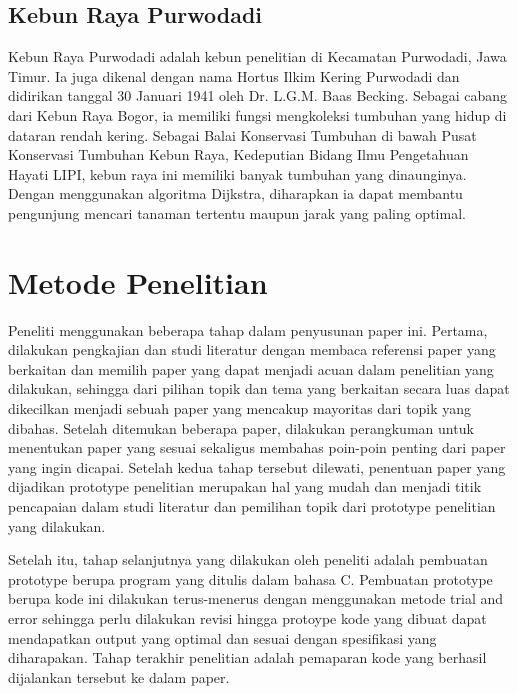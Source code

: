 \documentclass[conference]{IEEEtran}
\begin{document}
\subsection{Kebun Raya Purwodadi}

    Kebun Raya Purwodadi adalah kebun penelitian di Kecamatan Purwodadi, Jawa Timur. Ia juga dikenal dengan nama
    Hortus Ilkim Kering Purwodadi dan didirikan tanggal 30 Januari 1941 oleh Dr. L.G.M. Baas Becking. Sebagai cabang dari
    Kebun Raya Bogor, ia memiliki fungsi mengkoleksi tumbuhan
    yang hidup di dataran rendah kering. Sebagai Balai Konservasi
    Tumbuhan di bawah Pusat Konservasi Tumbuhan Kebun Raya,
    Kedeputian Bidang Ilmu Pengetahuan Hayati LIPI, kebun raya
    ini memiliki banyak tumbuhan yang dinaunginya. Dengan
    menggunakan algoritma Dijkstra, diharapkan ia dapat membantu pengunjung mencari tanaman tertentu maupun jarak
    yang paling optimal.

\section{Metode Penelitian}
    Peneliti menggunakan beberapa tahap dalam penyusunan
    paper ini. Pertama, dilakukan pengkajian dan studi literatur
    dengan membaca referensi paper yang berkaitan dan memilih
    paper yang dapat menjadi acuan dalam penelitian yang dilakukan, sehingga dari pilihan topik dan tema yang berkaitan
    secara luas dapat dikecilkan menjadi sebuah paper yang mencakup mayoritas dari topik yang dibahas. Setelah ditemukan
    beberapa paper, dilakukan perangkuman untuk menentukan
    paper yang sesuai sekaligus membahas poin-poin penting
    dari paper yang ingin dicapai. Setelah kedua tahap tersebut
    dilewati, penentuan paper yang dijadikan prototype penelitian
    merupakan hal yang mudah dan menjadi titik pencapaian
    dalam studi literatur dan pemilihan topik dari prototype penelitian yang dilakukan.

    Setelah itu, tahap selanjutnya yang dilakukan oleh peneliti
    adalah pembuatan prototype berupa program yang ditulis
    dalam bahasa C. Pembuatan prototype berupa kode ini dilakukan terus-menerus dengan menggunakan metode trial and
    error sehingga perlu dilakukan revisi hingga protoype kode
    yang dibuat dapat mendapatkan output yang optimal dan
    sesuai dengan spesifikasi yang diharapakan. Tahap terakhir
    penelitian adalah pemaparan kode yang berhasil dijalankan tersebut ke dalam paper.
\end{document}
